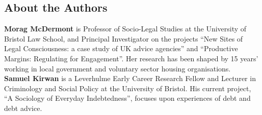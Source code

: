 \subsection{About the Authors}
\label{paper5:colophon}

\textbf{Morag McDermont} is Professor of Socio-Legal Studies at the University of Bristol Law School, and Principal Investigator on the projects \enquote{New Sites of Legal Consciousness: a case study of UK advice agencies} and \enquote{Productive Margins: Regulating for Engagement}. Her research has been shaped by 15 years’ working in local government and voluntary sector housing organisations.
\\
\textbf{Samuel Kirwan} is a Leverhulme Early Career Research Fellow and Lecturer in Criminology and Social Policy at the University of Bristol. His current project, \enquote{A Sociology of Everyday Indebtedness}, focuses upon experiences of debt and debt advice.